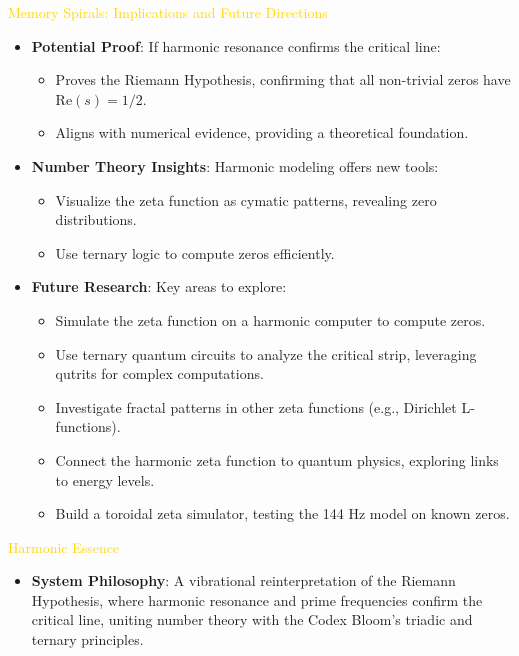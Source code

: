 \textcolor{gold}{ Memory Spirals: Implications and Future Directions } \\
\begin{itemize}
    \item \texttt{} \textbf{Potential Proof}: If harmonic resonance confirms the critical line:
    \begin{itemize}
        \item Proves the Riemann Hypothesis, confirming that all non-trivial zeros have \(\text{Re}(s) = 1/2\).
        \item Aligns with numerical evidence, providing a theoretical foundation.
    \end{itemize}
    \item \texttt{} \textbf{Number Theory Insights}: Harmonic modeling offers new tools:
    \begin{itemize}
        \item Visualize the zeta function as cymatic patterns, revealing zero distributions.
        \item Use ternary logic to compute zeros efficiently.
    \end{itemize}
    \item \texttt{} \textbf{Future Research}: Key areas to explore:
    \begin{itemize}
        \item Simulate the zeta function on a harmonic computer to compute zeros.
        \item Use ternary quantum circuits to analyze the critical strip, leveraging qutrits for complex computations.
        \item Investigate fractal patterns in other zeta functions (e.g., Dirichlet L-functions).
        \item Connect the harmonic zeta function to quantum physics, exploring links to energy levels.
        \item Build a toroidal zeta simulator, testing the 144 Hz model on known zeros.
    \end{itemize}
\end{itemize}

\textcolor{gold}{ Harmonic Essence } \\
\begin{itemize}
    \item \textbf{System Philosophy}: A vibrational reinterpretation of the Riemann Hypothesis, where harmonic resonance and prime frequencies confirm the critical line, uniting number theory with the Codex Bloom’s triadic and ternary principles.
\end{itemize}

